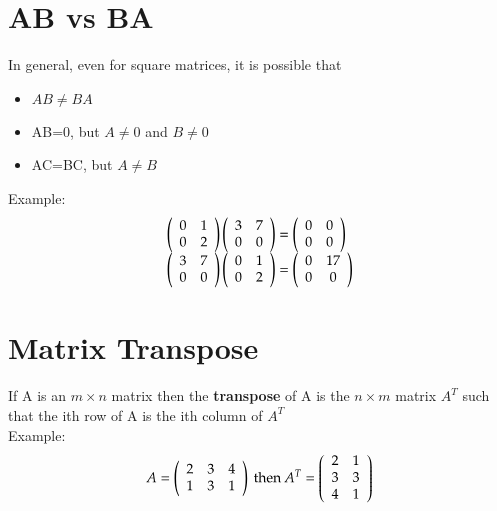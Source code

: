 \documentclass{article}[18pt]
\begin{document}
\section{AB vs BA}
In general, even for square matrices, it is possible that
\begin{itemize}
	\item $AB\neq BA$
	\item AB=0, but $A\neq 0$ and $B\neq 0$
	\item AC=BC, but $A\neq B$
\end{itemize}
Example:
$$\begin{array} { l } { \left( \begin{array} { l l } { 0 } & { 1 } \\ { 0 } & { 2 } \end{array} \right) \left( \begin{array} { c c } { 3 } & { 7 } \\ { 0 } & { 0 } \end{array} \right) = \left( \begin{array} { c c } { 0 } & { 0 } \\ { 0 } & { 0 } \end{array} \right) } \\ { \left( \begin{array} { c c } { 3 } & { 7 } \\ { 0 } & { 0 } \end{array} \right) \left( \begin{array} { c c } { 0 } & { 1 } \\ { 0 } & { 2 } \end{array} \right) = \left( \begin{array} { c c } { 0 } & { 17 } \\ { 0 } & { 0 } \end{array} \right) } \end{array}$$
\section{Matrix Transpose}
If A is an $m\times n$ matrix then the \textbf{transpose} of A is the $n\times m$ matrix $A^T$ such that the ith row of A is the ith column of $A^T$\\
Example:
$$A = \left( \begin{array} { c c c } { 2 } & { 3 } & { 4 } \\ { 1 } & { 3 } & { 1 } \end{array} \right) \text { then } A ^ { T } = \left( \begin{array} { c c } { 2 } & { 1 } \\ { 3 } & { 3 } \\ { 4 } & { 1 } \end{array} \right)$$
\end{document}
